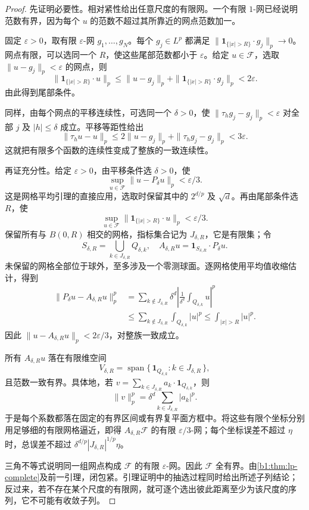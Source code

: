 \begin{proof}
先证明必要性。相对紧性给出任意尺度的有限网。一个有限 \(1\)-网已经说明范数有界，因为每个 \(u\) 的范数不超过其所靠近的网点范数加一。

固定 \(\varepsilon>0\)，取有限 \(\varepsilon\)-网
\(g_1,\ldots,g_N\)。每个 \(g_j\in L^p\) 都满足
\(\|\mathbf1_{\{|x|>R\}}\cdot g_j\|_p\to0\)。网点有限，可以选同一个 \(R\)，使这些尾部范数都小于 \(\varepsilon\)。给定 \(u\in\mathcal F\)，选取
\(\|u-g_j\|_p<\varepsilon\) 的网点，则
\[
 \|\mathbf1_{\{|x|>R\}}\cdot u\|_p
 \leq\|u-g_j\|_p+\|\mathbf1_{\{|x|>R\}}\cdot g_j\|_p<2\varepsilon.
\]
由此得到尾部条件。

同样，由每个网点的平移连续性，可选同一个 \(\delta>0\)，使
\(\|\tau_hg_j-g_j\|_p<\varepsilon\) 对全部 \(j\) 及
\(|h|\leq\delta\) 成立。平移等距性给出
\[
 \|\tau_hu-u\|_p
 \leq2\|u-g_j\|_p+\|\tau_hg_j-g_j\|_p<3\varepsilon.
\]
这就把有限多个函数的连续性变成了整族的一致连续性。

再证充分性。给定 \(\varepsilon>0\)，由平移条件选 \(\delta>0\)，使
\[
 \sup_{u\in\mathcal F}\|u-P_\delta u\|_p<\varepsilon/3.
\]
这是网格平均引理的直接应用，选取时保留其中的
\(2^{d/p}\) 及 \(\sqrt d\)。再由尾部条件选 \(R\)，使
\[
 \sup_{u\in\mathcal F}\|\mathbf1_{\{|x|>R\}}\cdot u\|_p<\varepsilon/3.
\]
保留所有与 \(B(0,R)\) 相交的网格，指标集合记为 \(J_{\delta,R}\)，它是有限集；令
\[
 S_{\delta,R}=\bigcup_{k\in J_{\delta,R}}Q_{\delta,k},
 \quad A_{\delta,R}u=\mathbf1_{S_{\delta,R}}\cdot P_\delta u.
\]
未保留的网格全部位于球外，至多涉及一个零测球面。逐网格使用平均值收缩估计，得到
\begin{equation}\label{b1:eq:cell-projection-tail}
 \begin{aligned}
 \|P_\delta u-A_{\delta,R}u\|_p^p
 &=\sum_{k\notin J_{\delta,R}}
       \delta^d\left|\frac1{\delta^d}\int_{Q_{\delta,k}}u\right|^p\\
 &\leq\sum_{k\notin J_{\delta,R}}\int_{Q_{\delta,k}}|u|^p
 \leq\int_{|x|>R}|u|^p.
 \end{aligned}
\end{equation}
因此
\(\|u-A_{\delta,R}u\|_p<2\varepsilon/3\)，对整族一致成立。

所有 \(A_{\delta,R}u\) 落在有限维空间
\[
 V_{\delta,R}
 =\operatorname{span}\{\,\mathbf1_{Q_{\delta,k}}:k\in J_{\delta,R}\,\},
\]
且范数一致有界。具体地，若 \(v=\sum_{k\in J_{\delta,R}}a_k\cdot\mathbf1_{Q_{\delta,k}}\)，则
\[
 \|v\|_p^p=\delta^d\sum_{k\in J_{\delta,R}}|a_k|^p.
\]
于是每个系数都落在固定的有界区间或有界复平面方框中。将这些有限个坐标分别用足够细的有限网格逼近，即得
\(A_{\delta,R}\mathcal F\) 的有限 \(\varepsilon/3\)-网；每个坐标误差不超过 \(\eta\) 时，总误差不超过
\(\delta^{d/p}|J_{\delta,R}|^{1/p}\eta\)。

三角不等式说明同一组网点构成 \(\mathcal F\) 的有限
\(\varepsilon\)-网。因此 \(\mathcal F\) 全有界。由\cref{b1:thm:lp-complete}及前一引理，闭包紧。引理证明中的抽选过程同时给出所述子列结论；反过来，若不存在某个尺度的有限网，就可逐个选出彼此距离至少为该尺度的序列，它不可能有收敛子列。
\end{proof}


